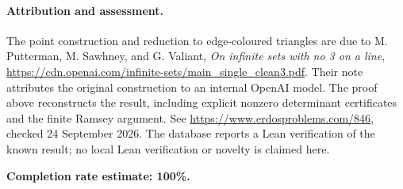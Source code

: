 \paragraph{Attribution and assessment.}
The point construction and reduction to edge-coloured triangles are due to M. Putterman, M. Sawhney, and G. Valiant, \emph{On infinite sets with no 3 on a line}, \url{https://cdn.openai.com/infinite-sets/main_single_clean3.pdf}. Their note attributes the original construction to an internal OpenAI model. The proof above reconstructs the result, including explicit nonzero determinant certificates and the finite Ramsey argument. See \url{https://www.erdosproblems.com/846}, checked 24 September 2026. The database reports a Lean verification of the known result; no local Lean verification or novelty is claimed here.

\textbf{Completion rate estimate: 100\%.}
